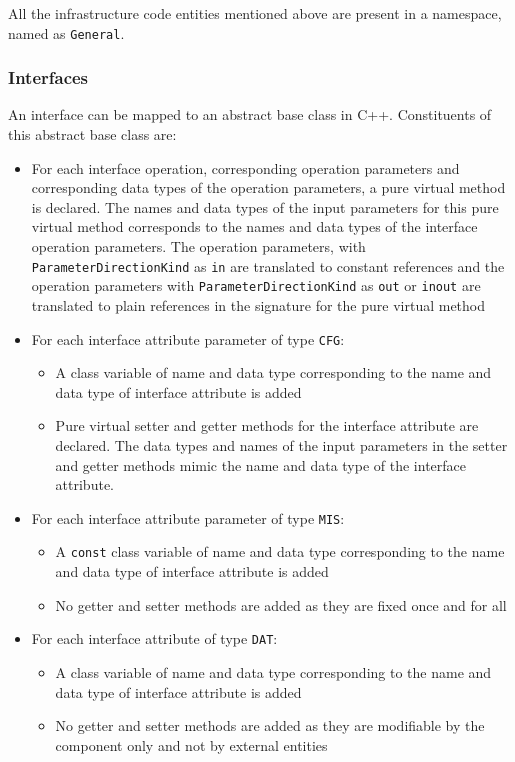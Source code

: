 All the infrastructure code entities mentioned above are present in a namespace, named as \texttt{General}.  

\subsubsection{\textbf{Interfaces}}
An interface can be mapped to an abstract base class in C++. Constituents of this abstract base class are:

\begin{itemize}
\item For each interface operation, corresponding operation parameters and corresponding data types of the operation parameters, a pure virtual method is declared. The names and data types of the input parameters for this pure virtual method corresponds to the names and data types of the interface operation parameters. The operation parameters, with \texttt{ParameterDirectionKind} as \texttt{in} are translated to constant references and the operation parameters with \texttt{ParameterDirectionKind} as \texttt{out} or \texttt{inout} are translated to plain references in the signature for the pure virtual method  
\item For each interface attribute parameter of type \texttt{CFG}:
\begin{itemize}
\item A class variable of name and data type corresponding to the name and data type of interface attribute is added
\item Pure virtual setter and getter methods for the interface attribute are declared. The data types and names of the input parameters in the setter and getter methods mimic the name and data type of the interface attribute.
\end{itemize} 
\item For each interface attribute parameter of type \texttt{MIS}: 
\begin{itemize}
\item A \texttt{const} class variable of name and data type corresponding to the name and data type of interface attribute is added
\item No getter and setter methods are added as they are fixed once and for all \cite{SpecMetamodel}
\end{itemize}
\item For each interface attribute of type \texttt{DAT}:
\begin{itemize}
\item A class variable of name and data type corresponding to the name and data type of interface attribute is added
\item No getter and setter methods are added as they are modifiable by the component only and not by external entities \cite{SpecMetamodel}  
\end{itemize}   
\end{itemize}


